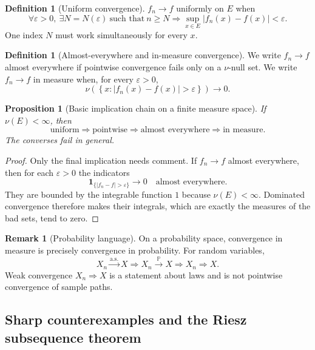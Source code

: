 \documentclass[10pt,a4paper]{article}
\numberwithin{equation}{section}
\theoremstyle{blueplain}
\newtheorem{proposition}[theorem]{Proposition}
\theoremstyle{definition}
\newtheorem{definition}[theorem]{Definition}
\newtheorem{remark}[theorem]{Remark}
\newcommand{\Pp}{\mathbb P}
\newcommand{\ind}{\mathbf 1}
\begin{document}
\begin{definition}[Uniform convergence]
\(f_n\to f\) uniformly on \(E\) when
\[
  \forall\varepsilon>0,\ 
  \exists N=N(\varepsilon)
  \ \text{such that}\ 
  n\ge N\Longrightarrow
  \sup_{x\in E}|f_n(x)-f(x)|<\varepsilon.
\]
One index \(N\) must work simultaneously for every \(x\).
\end{definition}

\begin{definition}[Almost-everywhere and in-measure convergence]
We write \(f_n\to f\) almost everywhere if pointwise convergence fails only
on a \(\nu\)-null set.  We write \(f_n\to f\) in measure when, for every
\(\varepsilon>0\),
\[
  \nu\!\left(\left\{x:|f_n(x)-f(x)|>\varepsilon\right\}\right)
  \longrightarrow0.
\]
\end{definition}

\begin{proposition}[Basic implication chain on a finite measure space]
If \(\nu(E)<\infty\), then
\[
  \text{uniform}
  \Longrightarrow
  \text{pointwise}
  \Longrightarrow
  \text{almost everywhere}
  \Longrightarrow
  \text{in measure}.
  \label{eq:function-convergence-chain}
\]
The converses fail in general.
\end{proposition}

\begin{proof}
Only the final implication needs comment.  If \(f_n\to f\) almost everywhere,
then for each \(\varepsilon>0\) the indicators
\[
  \ind_{\{|f_n-f|>\varepsilon\}}\longrightarrow0
  \quad\text{almost everywhere}.
\]
They are bounded by the integrable function \(1\) because \(\nu(E)<\infty\).
Dominated convergence therefore makes their integrals, which are exactly the
measures of the bad sets, tend to zero.
\end{proof}

\begin{remark}[Probability language]
On a probability space, convergence in measure is precisely convergence in
probability.  For random variables,
\[
  X_n\xrightarrow{\mathrm{a.s.}}X
  \Longrightarrow
  X_n\xrightarrow{\Pp}X
  \Longrightarrow
  X_n\Rightarrow X.
\]
Weak convergence \(X_n\Rightarrow X\) is a statement about laws and is not
pointwise convergence of sample paths.
\end{remark}

\subsection{Sharp counterexamples and the Riesz subsequence theorem}
\end{document}
